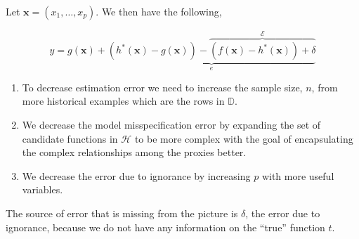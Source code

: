 \documentclass[12pt]{article}
\begin{document}
\begin{enumerate}
\begin{tcolorbox}[colback=white, sharp corners]
Let $\mathbf{x} = (x_1, \ldots, x_p)$. We then have the following, 

\[
	y  = g(\mathbf{x}) + \underbrace{\left(h^{*}(\mathbf{x}) - g(\mathbf{x}) \right) - \overbrace{\left(f(\mathbf{x}) - h^{*}(\mathbf{x}) \right) + \delta}^{\mathcal{E}}}_{e}
\]

\end{tcolorbox}

\newpage

\begin{tcolorbox}[colback=white, sharp corners]

\begin{enumerate}
	\item[1.] To decrease estimation error we need to increase the sample size, $n$, from more historical examples which are the rows in $\mathbb{D}$.
	\item[2.] We decrease the model misspecification error by expanding the set of candidate functions in $\mathcal{H}$ to be more complex with the goal of encapsulating the complex relationships among the proxies better. 
	\item[3.] We decrease the error due to ignorance by increasing $p$ with more useful variables. 
\end{enumerate}

\end{tcolorbox}


\begin{tcolorbox}[colback=white, sharp corners]

The source of error that is missing from the picture is $\delta$, the error due to ignorance, because we do not have any information on the ``true'' function $t$. 

\end{tcolorbox}



\end{enumerate}
\end{document}
